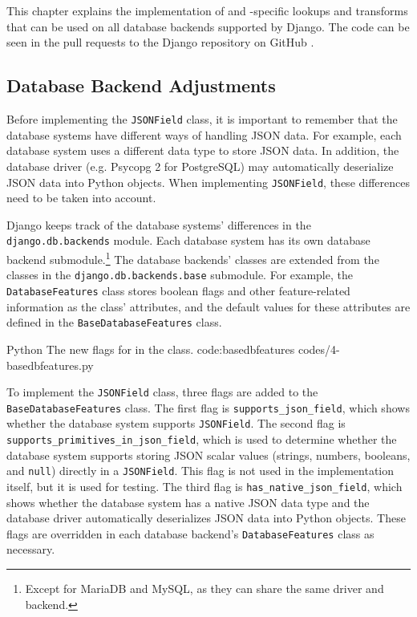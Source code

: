 \chapter{\babEmpat}

This chapter explains the implementation of  and
-specific lookups and transforms that can be used on all
database backends supported by Django. The code can be seen in the pull requests
to the Django repository on GitHub
\cite{django:jsonfield-pr, django:contains-pr}.

\section{Database Backend Adjustments}

Before implementing the \verb|JSONField| class, it is important to remember
that the database systems have different ways of handling JSON data. For
example, each database system uses a different data type to store JSON data. In
addition, the database driver (e.g. Psycopg 2 for PostgreSQL) may automatically
deserialize JSON data into Python objects. When implementing \verb|JSONField|,
these differences need to be taken into account.

Django keeps track of the database systems' differences in the
\verb|django.db.backends| module. Each database system has its own database
backend submodule.\footnote{Except for MariaDB and MySQL, as they can share the
same driver and backend.} The database backends' classes are extended from the
classes in the \verb|django.db.backends.base| submodule. For example, the
\verb|DatabaseFeatures| class stores boolean flags and other feature-related
information as the class' attributes, and the default values for these
attributes are defined in the \verb|BaseDatabaseFeatures| class.

\listing
{Python}
{The new flags for  in the  class.}
{code:basedbfeatures}
{codes/4-basedbfeatures.py}

To implement the \verb|JSONField| class, three flags are added to the
\verb|BaseDatabaseFeatures| class. The first flag is
\verb|supports_json_field|, which shows whether the database system supports
\verb|JSONField|. The second flag is \verb|supports_primitives_in_json_field|,
which is used to determine whether the database system supports storing JSON
scalar values (strings, numbers, booleans, and \verb|null|) directly in a
\verb|JSONField|. This flag is not used in the  implementation
itself, but it is used for testing. The third flag is
\verb|has_native_json_field|, which shows whether the database system has a
native JSON data type and the database driver automatically deserializes JSON
data into Python objects. These flags are overridden in each database backend's
\verb|DatabaseFeatures| class as necessary.

